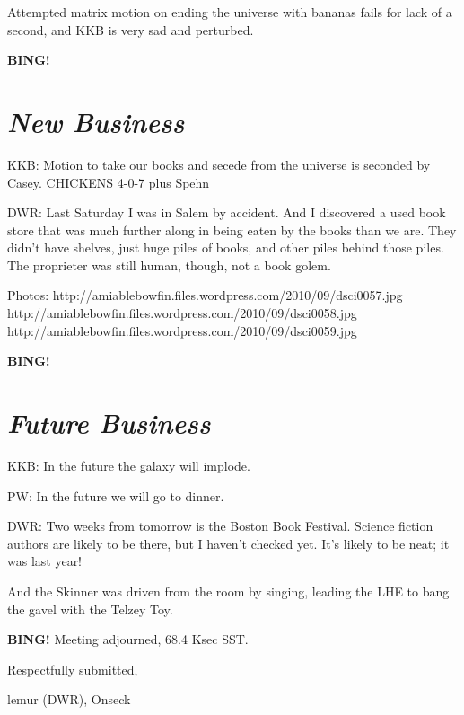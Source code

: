\documentclass[10pt]{article}
\newcommand{\bing}{{\bf BING!} }
\newcommand{\goto}[1]{\bing \vskip 12pt \section*{{\em{#1}}}}
\newcommand{\ps}{ plus Spehn\xspace}
\newcommand{\onseck}{lemur (DWR), Onseck}
\begin{document}
Attempted matrix motion on ending the universe with bananas fails for lack of a
second, and KKB is very sad and perturbed.

\goto{New Business}

KKB: Motion to take our books and secede from the universe is seconded by Casey.
CHICKENS 4-0-7\ps

DWR: Last Saturday I was in Salem by accident.  And I discovered a used book
store that was much further along in being eaten by the books than we are.
They didn't have shelves, just huge piles of books, and other piles behind those
piles.  The proprieter was still human, though, not a book golem.

Photos:
http://amiablebowfin.files.wordpress.com/2010/09/dsci0057.jpg
http://amiablebowfin.files.wordpress.com/2010/09/dsci0058.jpg
http://amiablebowfin.files.wordpress.com/2010/09/dsci0059.jpg


\goto{Future Business}

KKB: In the future the galaxy will implode.

PW: In the future we will go to dinner.

DWR: Two weeks from tomorrow is the Boston Book Festival.  Science fiction
authors are likely to be there, but I haven't checked yet.  It's likely to be
neat; it was last year!

And the Skinner was driven from the room by singing, leading the LHE to bang the
gavel with the Telzey Toy.

\bing
\noindent
Meeting adjourned, 68.4 Ksec SST.

\vspace{18pt}

\centerline{Respectfully submitted,}
\centerline{\onseck}
\end{document}
